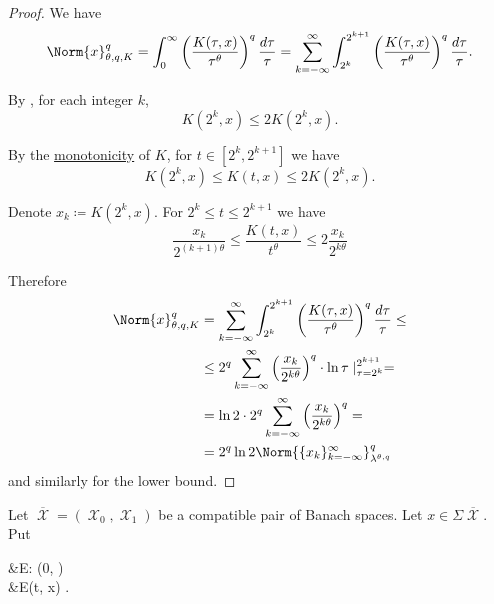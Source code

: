 \begin{proof}
  We have
  \begin{equation*}
    \Norm{x}_{\theta,q,K}^q
    =
    \int_0^\infty \left( \frac {K(\tau, x)} {\tau^\theta} \right)^q \frac {d\tau} \tau
    =
    \sum_{k=-\infty}^\infty \int_{2^k}^{2^{k+1}} \left( \frac {K(\tau, x)} {\tau^\theta} \right)^q \frac {d\tau} \tau.
  \end{equation*}

  By , for each integer \( k \),
  \begin{equation*}
    K(2^k, x) \leq 2 K(2^k, x).
  \end{equation*}

  By the \hyperref[def:k_functional_properties/basic]{monotonicity} of \( K \), for \( t \in [2^k, 2^{k+1}] \) we have
  \begin{equation*}
    K(2^k, x) \leq K(t, x) \leq 2 K(2^k, x).
  \end{equation*}

  Denote \( x_k \coloneqq K(2^k, x) \). For \( 2^k \leq t \leq 2^{k+1} \) we have
  \begin{equation*}
    \frac{x_k}{2^{(k+1)\theta}} \leq \frac{K(t, x)}{t^\theta} \leq 2 \frac{x_k}{2^{k\theta}}
  \end{equation*}

  Therefore
  \begin{align*}
    \Norm{x}_{\theta,q,K}^q
    &=
    \sum_{k=-\infty}^\infty \int_{2^k}^{2^{k+1}} \left( \frac {K(\tau, x)} {\tau^\theta} \right)^q \frac {d\tau} \tau
    \leq \\ &\leq
    2^q \sum_{k=-\infty}^\infty \left(\frac{x_k}{2^{k\theta}} \right)^q \cdot \ln \tau \mid_{\tau=2^k}^{2^{k+1}}
    = \\ &=
    \ln 2 \cdot 2^q \sum_{k=-\infty}^\infty \left(\frac{x_k}{2^{k\theta}} \right)^q
    = \\ &=
    2^q \ln 2 \Norm{\{ x_k \}_{k=-\infty}^\infty}_{\lambda^{\theta,q}}^q
  \end{align*}
  and similarly for the lower bound.
\end{proof}

\begin{definition}\label{def:e_functional}
  Let \( \overline{\mscrX} = (\mscrX_0, \mscrX_1) \) be a compatible pair of Banach spaces. Let \( x \in \Sigma \overline{\mscrX} \). Put
  \begin{AlignedEquation}\label{eq:def:e_functional}
    &E: (0, \infty) \times {\Sigma \overline{\mscrX}} \\
    &E(t, x) \coloneqq \inf {}.
  \end{AlignedEquation}
\end{definition}

